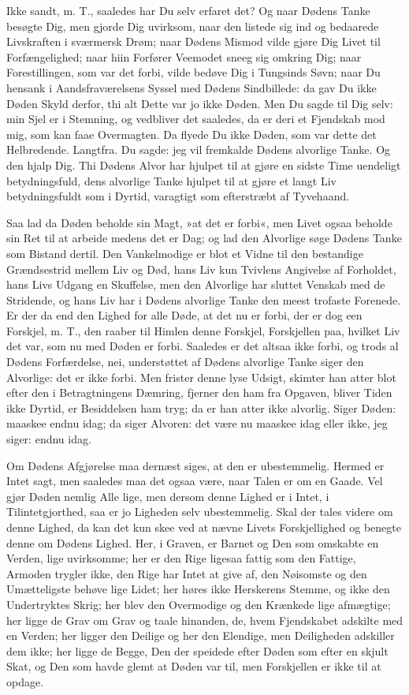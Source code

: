 \documentclass[12pt,a4paper]{article}
\begin{document}
Ikke sandt, m. T., saaledes har Du selv erfaret det? Og naar Dødens Tanke besøgte Dig, men gjorde Dig uvirksom, naar den listede sig ind og bedaarede Livskraften i sværmersk Drøm; naar Dødens Mismod vilde gjøre Dig Livet til Forfængelighed; naar hiin Forfører Veemodet sneeg sig omkring Dig; naar Forestillingen, som var det forbi, vilde bedøve Dig i Tungsinds Søvn; naar Du hensank i Aandsfraværelsens Syssel med Dødens Sindbillede: da gav Du ikke Døden Skyld derfor, thi alt Dette var jo ikke Døden. Men Du sagde til Dig selv: min Sjel er i Stemning, og vedbliver det saaledes, da er deri et Fjendskab mod mig, som kan faae Overmagten. Da flyede Du ikke Døden, som var dette det Helbredende. Langtfra. Du sagde: jeg vil fremkalde Dødens alvorlige Tanke. Og den hjalp Dig. Thi Dødens Alvor har hjulpet til at gjøre en sidste Time uendeligt betydningsfuld, dens alvorlige Tanke hjulpet til at gjøre et langt Liv betydningsfuldt som i Dyrtid, varagtigt som efterstræbt af Tyvehaand.

Saa lad da Døden beholde sin Magt, »at det er forbi«, men Livet ogsaa beholde sin Ret til at arbeide medens det er Dag; og lad den Alvorlige søge Dødens Tanke som Bistand dertil. Den Vankelmodige er blot et Vidne til den bestandige Grændsestrid mellem Liv og Død, hans Liv kun Tvivlens Angivelse af Forholdet, hans Livs Udgang en Skuffelse, men den Alvorlige har sluttet Venskab med de Stridende, og hans Liv har i Dødens alvorlige Tanke den meest trofaste Forenede. Er der da end den Lighed for alle Døde, at det nu er forbi, der er dog een Forskjel, m. T., den raaber til Himlen denne Forskjel, Forskjellen paa, hvilket Liv det var, som nu med Døden er forbi. Saaledes er det altsaa ikke forbi, og trods al Dødens Forfærdelse, nei, understøttet af Dødens alvorlige Tanke siger den Alvorlige: det er ikke forbi. Men frister denne lyse Udsigt, skimter han atter blot efter den i Betragtningens Dæmring, fjerner den ham fra Opgaven, bliver Tiden ikke Dyrtid, er Besiddelsen ham tryg; da er han atter ikke alvorlig. Siger Døden: maaskee endnu idag; da siger Alvoren: det være nu maaskee idag eller ikke, jeg siger: endnu idag.

Om Dødens Afgjørelse maa dernæst siges, at den er ubestemmelig. Hermed er Intet sagt, men saaledes maa det ogsaa være, naar Talen er om en Gaade. Vel gjør Døden nemlig Alle lige, men dersom denne Lighed er i Intet, i Tilintetgjorthed, saa er jo Ligheden selv ubestemmelig. Skal der tales videre om denne Lighed, da kan det kun skee ved at nævne Livets Forskjellighed og benegte denne om Dødens Lighed. Her, i Graven, er Barnet og Den som omskabte en Verden, lige uvirksomme; her er den Rige ligesaa fattig som den Fattige, Armoden trygler ikke, den Rige har Intet at give af, den Nøisomste og den Umætteligste behøve lige Lidet; her høres ikke Herskerens Stemme, og ikke den Undertryktes Skrig; her blev den Overmodige og den Krænkede lige afmægtige; her ligge de Grav om Grav og taale hinanden, de, hvem Fjendskabet adskilte med en Verden; her ligger den Deilige og her den Elendige, men Deiligheden adskiller dem ikke; her ligge de Begge, Den der speidede efter Døden som efter en skjult Skat, og Den som havde glemt at Døden var til, men Forskjellen er ikke til at opdage.
\end{document}
